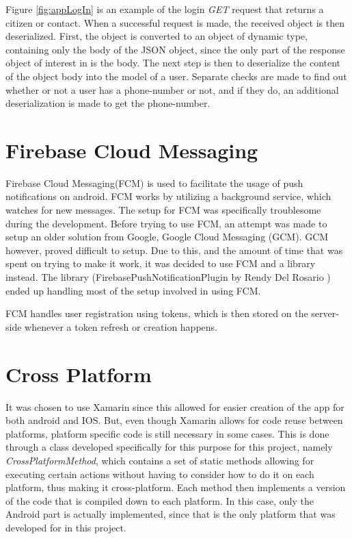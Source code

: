 Figure \ref{fig:appLogIn} is an example of the login \textit{GET} request that returns a citizen or contact. When a successful request is made, the received object is then deserialized. First, the object is converted to an object of dynamic type, containing only the body of the JSON object, since the only part of the response object of interest in is the body. The next step is then to deserialize the content of the object body into the model of a user. Separate checks are made to find out whether or not a user has a phone-number or not, and if they do, an additional deserialization is made to get the phone-number.

\section{Firebase Cloud Messaging}\label{sec:fcm}
Firebase Cloud Messaging(FCM) is used to facilitate the usage of push notifications on android. FCM works by utilizing a background service, which watches for new messages. The setup for FCM was specifically troublesome during the development. Before trying to use FCM, an attempt was made to setup an older solution from Google, Google Cloud Messaging (GCM). GCM however, proved difficult to setup. Due to this, and the amount of time that was spent on trying to make it work, it was decided to use FCM and a library instead. The library (FirebasePushNotificationPlugin by Rendy Del Rosario \cite{firebasePlugin}) ended up handling most of the setup involved in using FCM.

FCM handles user registration using tokens, which is then stored on the server-side whenever a token refresh or creation happens.

\section{Cross Platform}\label{sec:crossplat}
It was chosen to use Xamarin since this allowed for easier creation of the app for both android and IOS. But, even though Xamarin allows for code reuse between platforms, platform specific code is still necessary in some cases. This is done through a class developed specifically for this purpose for this project, namely \textit{CrossPlatformMethod}, which contains a set of static methods allowing for executing certain actions without having to consider how to do it on each platform, thus making it cross-platform. Each method then implements a version of the code that is compiled down to each platform. In this case, only the Android part is actually implemented, since that is the only platform that was developed for in this project. 

